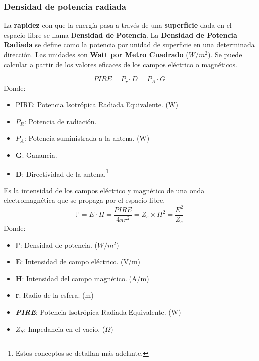 \documentclass[
	12pt, %
	fleqn, %
	a4paper, %
	oneside, %
]{LegrandOrangeBook}
\begin{document}
\subsubsection{Densidad de potencia radiada}
La \textbf{rapidez} con que la energía pasa a través de una \textbf{superficie} dada en el espacio libre se llama D\textbf{ensidad de Potencia}. La \textbf{Densidad de Potencia Radiada} se define como la potencia por unidad de superficie en una determinada dirección. Las unidades son \textbf{Watt por Metro Cuadrado} ($W/m^2$). Se puede calcular a partir de los valores eficaces de los campos eléctrico o magnéticos.
\begin{definition}
\begin{equation}
PIRE=P_r\cdot D=P_A\cdot G
\label{eq:pire}
\end{equation}
Donde:
\begin{itemize}
\item PIRE:  Potencia Isotrópica Radiada Equivalente. (W)
\item $P_R$: Potencia de radiación.
\item $P_A$: Potencia suministrada a la antena. (W)
\item \textbf{G}: Ganancia.
\item \textbf{D}: Directividad de la antena.\footnote{Estos conceptos se detallan más adelante.}
\end{itemize}
\end{definition}
\begin{definition}
Es la intensidad de los campos eléctrico y magnético de una onda electromagnética que se propaga por el espacio libre.
\begin{equation}
\mathbb{P}=E\cdot H=\frac{PIRE}{4\pi r^2}=Z_s\times H^2=\frac{E^2}{Z_s}
\label{eq:int campo}
\end{equation}
Donde:
\begin{itemize}
\item $\mathbb{P}$: Densidad de potencia. ($W/m^2$)
\item \textbf{E}: Intensidad de campo eléctrico. (V/m)
\item \textbf{H}: Intensidad del campo magnético. (A/m)
\item \textbf{r}: Radio de la esfera. (m)
\item \textbf{\textit{PIRE}}: Potencia Isotrópica Radiada Equivalente. (W)
\item \textbf{$Z_S$}: Impedancia en el vacío. ($\Omega$)
\end{itemize}

\end{definition}
\end{document}
